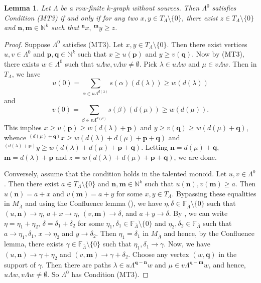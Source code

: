 \documentclass[a4paper,reqno,12pt]{amsart}
\numberwithin{equation}{section}
\newtheorem{lem}[thm]{Lemma}
\theoremstyle{definition}
\theoremstyle{remark}
\newcommand{\N}{\mathbf{n}}
\newcommand{\M}{\mathbf{m}}
\newcommand{\bP}{\mathbf{p}}
\newcommand{\Q}{\mathbf{q}}
\begin{document}
\begin{lem}\label{lem TM characterization of MT3}
Let $\Lambda$ be a row-finite $k$-graph without sources. Then $\Lambda^0$ satisfies Condition \textup{(MT3)} if and only if for any two $x,y\in T_\Lambda\setminus \{0\}$, there exist  $z \in T_\Lambda\setminus \{0\}$ and $\N,\M\in \mathbb{N}^k$ such that $^\N x,~^\M y\ge z$.    
\end{lem}
\begin{proof}
Suppose $\Lambda^0$ satisfies (MT3). Let $x,y\in T_\Lambda\setminus \{0\}$. Then there exist vertices $u,v\in \Lambda^0$ and $\bP,\Q\in \mathbb{N}^k$ such that $x\ge u(\bP)$ and $y\ge v(\Q)$. Now by (MT3), there exists $w\in \Lambda^0$ such that $u\Lambda w,v\Lambda w\neq \emptyset$. Pick $\lambda\in u\Lambda w$ and $\mu\in v\Lambda w$. Then in $T_\Lambda$, we have \[u(0)=\displaystyle{\sum_{\alpha\in u\Lambda^{d(\lambda)}}} s(\alpha)(d(\lambda))\ge w(d(\lambda))\] and \[v(0)=\displaystyle{\sum_{\beta\in v\Lambda^{d(\mu)}}} s(\beta)(d(\mu))\ge w(d(\mu)).\] This implies $x\ge u(\bP)\ge w(d(\lambda)+\bP)$ and $y\ge v(\Q)\ge w(d(\mu)+\Q)$, whence $^{(d(\mu)+\Q)}x\ge w(d(\lambda)+d(\mu)+\bP+\Q)$ and $^{(d(\lambda)+\bP)}y\ge w(d(\lambda)+d(\mu)+\bP+\Q)$. Letting $\N=d(\mu)+\Q$, $\M=d(\lambda)+\bP$ and $z=w(d(\lambda)+d(\mu)+\bP+\Q)$, we are done. 

Conversely,  assume that the condition holds in the talented monoid. Let $u,v\in \Lambda^0$. Then there exist $a\in T_\Lambda\setminus \{0\}$ and $\N,\M\in \mathbb{N}^k$ such that $u(\N),v(\M)\ge a$. Then $u(\N)=a+x$ and $v(\M)=a+y$ for some $x,y\in T_\Lambda$. Bypassing these equalities in $M_{\overline{\Lambda}}$ and using the Confluence lemma (\cite[Lemma 3.5]{HMPS1}), we have $\eta,\delta\in \mathbb{F}_{\overline{\Lambda}}\setminus \{0\}$ such that $(u,\N)\longrightarrow \eta$, $a+x\longrightarrow \eta$, $(v,\M)\longrightarrow \delta$, and $a+y\longrightarrow \delta$. By \cite[Lemma 3.1]{HMPS1}, we can write $\eta=\eta_1+\eta_2$, $\delta=\delta_1+\delta_2$ for some $\eta_1,\delta_1\in \mathbb{F}_{\overline{\Lambda}}\setminus \{0\}$ and $\eta_2,\delta_2\in \mathbb{F}_{\overline{\Lambda}}$ such that $a\longrightarrow \eta_1,\delta_1$, $x\longrightarrow \eta_2$ and $y\longrightarrow \delta_2$. Then $\eta_1=\delta_1$ in $M_{\overline{\Lambda}}$ and hence, by the Confluence lemma, there exists $\gamma\in \mathbb{F}_{\overline{\Lambda}}\setminus \{0\}$ such that $\eta_1,\delta_1\longrightarrow \gamma$. Now, we have $(u,\N)\longrightarrow \gamma+\eta_2$ and $(v,\M)\longrightarrow \gamma+\delta_2$. Choose any vertex $(w,\Q)$ in the support of $\gamma$. Then there are paths $\lambda\in u\Lambda^{\Q-\N}w$ and $\mu\in v\Lambda^{\Q-\M}w$, and hence, $u\Lambda w,v\Lambda w\neq \emptyset$. So $\Lambda^0$ has Condition (MT3).
\end{proof}
\end{document}
